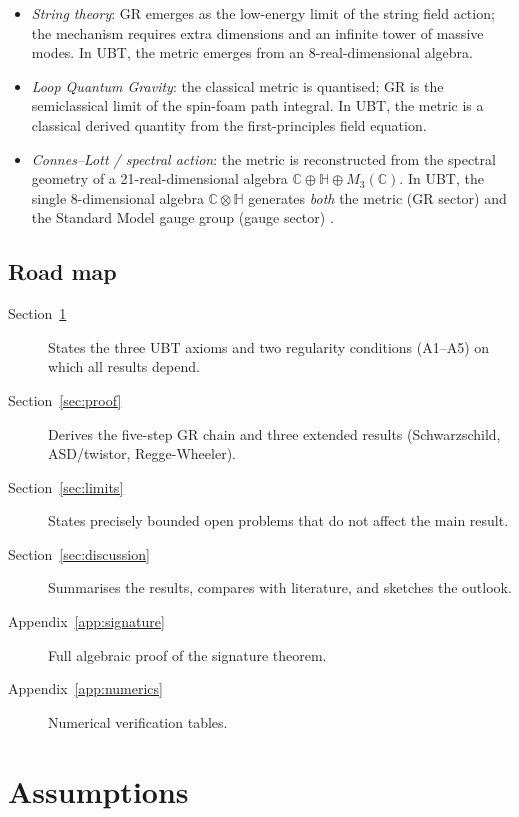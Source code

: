 \documentclass[12pt,a4paper]{article}
\theoremstyle{definition}
\theoremstyle{remark}
\begin{document}
\begin{itemize}
\item \emph{String theory}: GR emerges as the low-energy limit of the string
  field action; the mechanism requires extra dimensions and an infinite tower of
  massive modes.  In UBT, the metric emerges from an 8-real-dimensional algebra.

\item \emph{Loop Quantum Gravity}: the classical metric is quantised; GR is
  the semiclassical limit of the spin-foam path integral.  In UBT, the metric
  is a classical derived quantity from the first-principles field equation.

\item \emph{Connes--Lott / spectral action}: the metric is reconstructed from
  the spectral geometry of a 21-real-dimensional algebra
  $\mathbb{C}\oplus\mathbb{H}\oplus M_3(\mathbb{C})$.  In UBT, the single
  8-dimensional algebra $\mathbb{C}\otimes\mathbb{H}$ generates \emph{both} the
  metric (GR sector) and the Standard Model gauge group (gauge sector)
  \cite{Connes1996}.
\end{itemize}

\subsection{Road map}

\begin{description}
\item[Section~\ref{sec:assumptions}] States the three UBT axioms and two
  regularity conditions (A1--A5) on which all results depend.
\item[Section~\ref{sec:proof}] Derives the five-step GR chain and three
  extended results (Schwarzschild, ASD/twistor, Regge-Wheeler).
\item[Section~\ref{sec:limits}] States precisely bounded open problems
  that do not affect the main result.
\item[Section~\ref{sec:discussion}] Summarises the results, compares with
  literature, and sketches the outlook.
\item[Appendix~\ref{app:signature}] Full algebraic proof of the signature theorem.
\item[Appendix~\ref{app:numerics}] Numerical verification tables.
\end{description}

\section{Assumptions}
\label{sec:assumptions}
\end{document}
